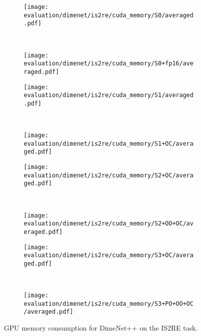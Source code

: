 \begin{figure}[H]

    \centering

    \begin{subfigure}[t]{0.45\textwidth}
        \centering
        \texttt{[image: evaluation/dimenet/is2re/cuda\_memory/S0/averaged.pdf]}
    \end{subfigure}%
    ~
    \begin{subfigure}[t]{0.45\textwidth}
        \centering
        \texttt{[image: evaluation/dimenet/is2re/cuda\_memory/S0+fp16/averaged.pdf]}
    \end{subfigure}

    \begin{subfigure}[t]{0.45\textwidth}
        \centering
        \texttt{[image: evaluation/dimenet/is2re/cuda\_memory/S1/averaged.pdf]}
    \end{subfigure}%
    ~
    \begin{subfigure}[t]{0.45\textwidth}
        \centering
        \texttt{[image: evaluation/dimenet/is2re/cuda\_memory/S1+OC/averaged.pdf]}
    \end{subfigure}

    \begin{subfigure}[t]{0.45\textwidth}
        \centering
        \texttt{[image: evaluation/dimenet/is2re/cuda\_memory/S2+OC/averaged.pdf]}
    \end{subfigure}%
    ~
    \begin{subfigure}[t]{0.45\textwidth}
        \centering
        \texttt{[image: evaluation/dimenet/is2re/cuda\_memory/S2+OO+OC/averaged.pdf]}
    \end{subfigure}

    \begin{subfigure}[t]{0.45\textwidth}
        \centering
        \texttt{[image: evaluation/dimenet/is2re/cuda\_memory/S3+OC/averaged.pdf]}
    \end{subfigure}%
    ~
    \begin{subfigure}[t]{0.45\textwidth}
        \centering
        \texttt{[image: evaluation/dimenet/is2re/cuda\_memory/S3+PO+OO+OC/averaged.pdf]}
    \end{subfigure}

    \caption{GPU memory consumption for DimeNet++ on the IS2RE task.}
    
\end{figure}